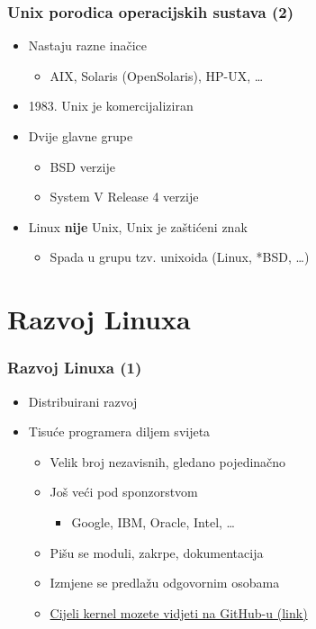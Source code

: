\documentclass{beamer}
\begin{document}
\begin{frame}[t]
\frametitle{Unix porodica operacijskih sustava (2)}
\begin{itemize}
  \item Nastaju razne inačice
  \begin{itemize}
    \item AIX, Solaris (OpenSolaris), HP-UX, \ldots
  \end{itemize}
  \item 1983. Unix je komercijaliziran
  \item Dvije glavne grupe
  \begin{itemize}
    \item BSD verzije
    \item System V Release 4 verzije
  \end{itemize}
  \item Linux \textbf{nije} Unix, Unix je zaštićeni znak
  \begin{itemize}
    \item Spada u grupu tzv. unixoida (Linux, *BSD, \ldots)
  \end{itemize}
\end{itemize}
\end{frame}

\section{Razvoj Linuxa}
\begin{frame}[t]
\frametitle{Razvoj Linuxa (1)}
\begin{itemize}
  \item Distribuirani razvoj
  \item Tisuće programera diljem svijeta
  \begin{itemize}
    \item Velik broj nezavisnih, gledano pojedinačno
    \item Još veći pod sponzorstvom
    \begin{itemize}
      \item Google, IBM, Oracle, Intel, \ldots
    \end{itemize}
  \item Pišu se moduli, zakrpe, dokumentacija
  \item Izmjene se predlažu odgovornim osobama
  \item \href{https://github.com/torvalds/linux}{Cijeli kernel mozete vidjeti na GitHub-u (link)}
  \end{itemize}
\end{itemize}
\end{frame}
\end{document}

